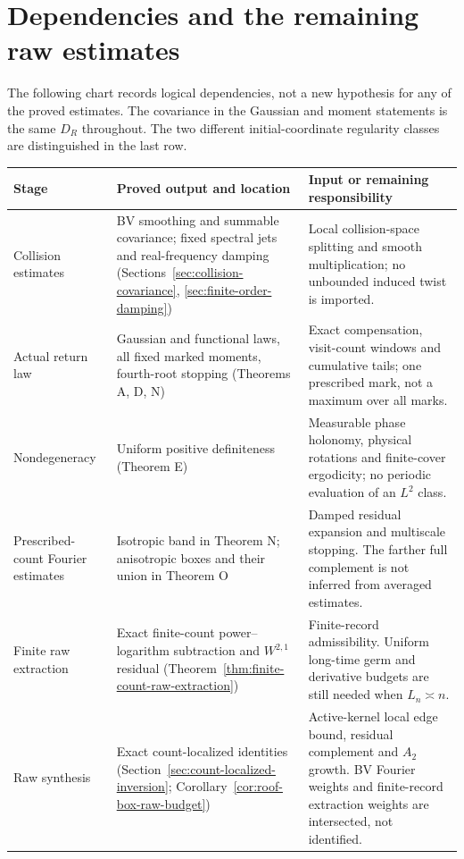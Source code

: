 \section{Dependencies and the remaining raw estimates}
\label{app:dependency-guide}
The following chart records logical dependencies, not a new hypothesis
for any of the proved estimates. The covariance in the Gaussian and
moment statements is the same $D_R$ throughout. The two different
initial-coordinate regularity classes are distinguished in the last row.

\begin{center}
\small
\renewcommand{\arraystretch}{1.25}
\begin{tabular}{@{}p{}p{}p{}@{}}
\hline
Stage & Proved output and location & Input or remaining responsibility\\
\hline
Collision estimates & BV smoothing and summable covariance;
fixed spectral jets and real-frequency damping
(Sections~\ref{sec:collision-covariance}, \ref{sec:finite-order-damping})
& Local collision-space splitting and smooth multiplication;
no unbounded induced twist is imported.\\
Actual return law & Gaussian and functional laws, all fixed marked
moments, fourth-root stopping
(Theorems A, D, N)
& Exact compensation, visit-count windows and cumulative tails;
one prescribed mark, not a maximum over all marks.\\
Nondegeneracy & Uniform positive definiteness (Theorem E)
& Measurable phase holonomy, physical rotations and finite-cover
ergodicity; no periodic evaluation of an $L^2$ class.\\
Prescribed-count Fourier estimates & Isotropic band in Theorem N;
anisotropic boxes and their union in Theorem O
& Damped residual expansion and multiscale stopping.
The farther full complement is not inferred from averaged estimates.\\
Finite raw extraction & Exact finite-count power--logarithm subtraction
and $W^{2,1}$ residual
(Theorem~\ref{thm:finite-count-raw-extraction})
& Finite-record admissibility. Uniform long-time germ and derivative
budgets are still needed when $L_n\asymp n$.\\
Raw synthesis & Exact count-localized identities
(Section~\ref{sec:count-localized-inversion};
Corollary~\ref{cor:roof-box-raw-budget})
& Active-kernel local edge bound, residual complement and $A_2$ growth.
BV Fourier weights and finite-record extraction weights are intersected,
not identified.\\
\hline
\end{tabular}
\end{center}

